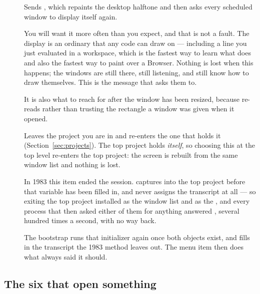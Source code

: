 \begin{description}

\item[] Sends , which
repaints the desktop halftone and then asks every scheduled window to display
itself again.

You will want it more often than you expect, and that is not a fault. The
display is an ordinary  that any code can draw on --- including a
line you just evaluated in a workspace, which is the fastest way to learn what
 does and also the fastest way to paint over a Browser. Nothing is
lost when this happens; the windows are still there, still listening, and
still know how to draw themselves. This is the message that asks them to.

It is also what to reach for after the window has been resized, because
 re-reads  rather than trusting the
rectangle a window was given when it opened.

\item[] Leaves the project you are in and re-enters the one
that holds it (Section~\ref{sec:projects}). The top project holds
\emph{itself}, so choosing this at the top level re-enters the top project:
the screen is rebuilt from the same window list and nothing is lost.

\begin{stnote}
In 1983 this item ended the session.  captures
 into the top project before that variable has been
filled in, and  never assigns the transcript at
all --- so exiting the top project installed  as the window list and
 as the , and every process that then asked either of
them for anything answered , several hundred times a
second, with no way back.

The bootstrap runs that initializer again once both objects exist, and fills
in the transcript the 1983 method leaves out. The menu item then does what
 always said it should.
\end{stnote}

\end{description}

\subsection{The six that open something}

